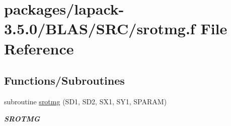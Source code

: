 \hypertarget{lapack-3_85_80_2BLAS_2SRC_2srotmg_8f}{}\section{packages/lapack-\/3.5.0/\+B\+L\+A\+S/\+S\+R\+C/srotmg.f File Reference}
\label{lapack-3_85_80_2BLAS_2SRC_2srotmg_8f}
\subsection*{Functions/\+Subroutines}
\begin{DoxyCompactItemize}
\item 
subroutine \hyperlink{group__single__blas__level1_ga97ce4e31b77723a3b60fb3f479f61316}{srotmg} (S\+D1, S\+D2, S\+X1, S\+Y1, S\+P\+A\+R\+A\+M)
\begin{DoxyCompactList}\small\item\em {\bfseries S\+R\+O\+T\+M\+G} \end{DoxyCompactList}\end{DoxyCompactItemize}
